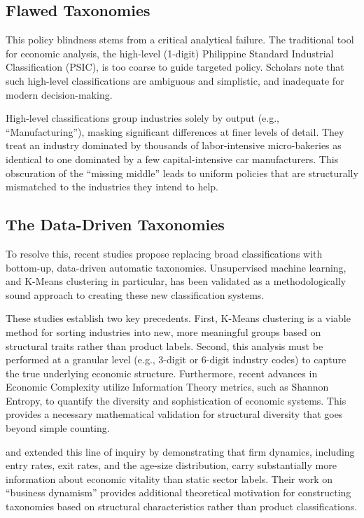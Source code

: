 \documentclass[acmtog, nonacm]{acmart}
\begin{document}
\subsection{Flawed Taxonomies}
This policy blindness stems from a critical analytical failure. The traditional tool for economic analysis, the high-level (1-digit) Philippine Standard Industrial Classification (PSIC), is too coarse to guide targeted policy. Scholars note that such high-level classifications are ambiguous and simplistic, and inadequate for modern decision-making.

High-level classifications group industries solely by output (e.g., ``Manufacturing''), masking significant differences at finer levels of detail. They treat an industry dominated by thousands of labor-intensive micro-bakeries as identical to one dominated by a few capital-intensive car manufacturers. This obscuration of the ``missing middle'' leads to uniform policies that are structurally mismatched to the industries they intend to help.

\subsection{The Data-Driven Taxonomies}
To resolve this, recent studies propose replacing broad classifications with bottom-up, data-driven automatic taxonomies. Unsupervised machine learning, and K-Means clustering in particular, has been validated as a methodologically sound approach to creating these new classification systems.

These studies establish two key precedents. First, K-Means clustering is a viable method for sorting industries into new, more meaningful groups based on structural traits rather than product labels. Second, this analysis must be performed at a granular level (e.g., 3-digit or 6-digit industry codes) to capture the true underlying economic structure. Furthermore, recent advances in Economic Complexity \citep{hidalgo2021} utilize Information Theory metrics, such as Shannon Entropy, to quantify the diversity and sophistication of economic systems. This provides a necessary mathematical validation for structural diversity that goes beyond simple counting.

\citet{haltiwanger2013} and \citet{decker2014} extended this line of inquiry by demonstrating that firm dynamics, including entry rates, exit rates, and the age-size distribution, carry substantially more information about economic vitality than static sector labels. Their work on ``business dynamism'' provides additional theoretical motivation for constructing taxonomies based on structural characteristics rather than product classifications.
\end{document}
